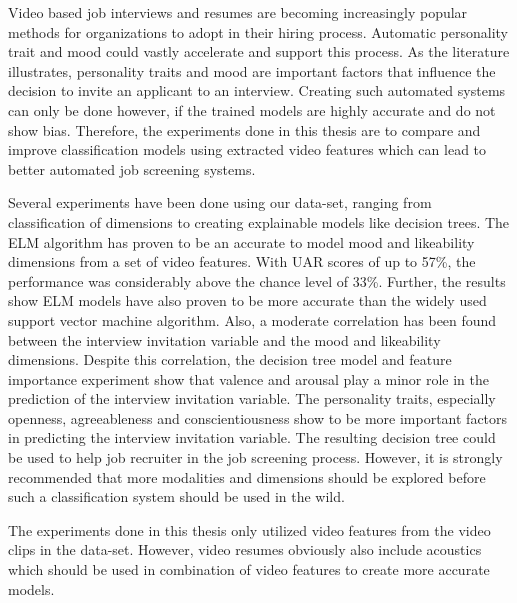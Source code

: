 Video based job interviews and resumes are becoming increasingly popular methods for organizations to adopt in their hiring process. Automatic personality trait and mood could vastly accelerate and support this process. As the literature illustrates, personality traits and mood are important factors that influence the decision to invite an applicant to an interview. Creating such automated systems can only be done however, if the trained models are highly accurate and do not show bias. Therefore, the experiments done in this thesis are to compare and improve classification models using extracted video features which can lead to better automated job screening systems.

Several experiments have been done using our data-set, ranging from classification of dimensions to creating explainable models like decision trees. The ELM algorithm has proven to be an accurate to model mood and likeability dimensions from a set of video features. With UAR scores of up to 57\%, the performance was considerably above the chance level of 33\%. Further, the results show ELM models have also proven to be more accurate than the widely used support vector machine algorithm. Also, a moderate correlation has been found between the interview invitation variable and the mood and likeability dimensions. Despite this correlation, the decision tree model and feature importance experiment show that valence and arousal play a minor role in the prediction of the interview invitation variable. The personality traits, especially openness, agreeableness and conscientiousness show to be more important factors in predicting the interview invitation variable. The resulting decision tree could be used to help job recruiter in the job screening process. However, it is strongly recommended that more modalities and dimensions should be explored before such a classification system should be used in the wild.

The experiments done in this thesis only utilized video features from the video clips in the data-set. However, video resumes obviously also include acoustics which should be used in combination of video features to create more accurate models. 


